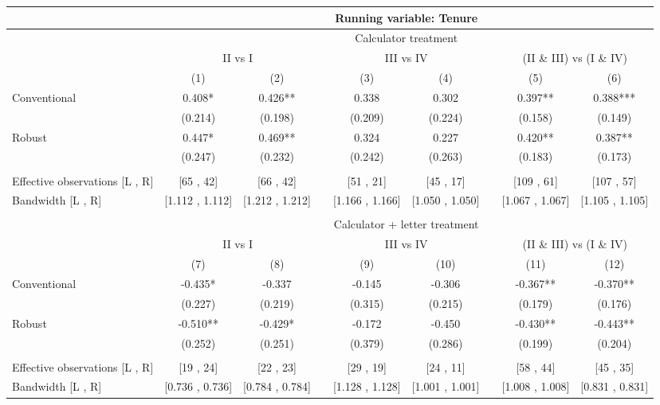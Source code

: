 \begin{tabular}{lcccccccc}
\toprule
      & \multicolumn{8}{c}{Running variable: Tenure} \\
\midrule
      & \multicolumn{8}{c}{Calculator treatment} \\
\midrule
      & \multicolumn{2}{c}{II vs I} &       & \multicolumn{2}{c}{III vs IV} &       & \multicolumn{2}{c}{(II \& III) vs (I \& IV)} \\
\cmidrule{2-3}\cmidrule{5-6}\cmidrule{8-9}      & (1)   & (2)   &       & (3)   & (4)   &       & (5)   & (6) \\
\midrule
\midrule
Conventional & 0.408* & 0.426** &       & 0.338 & 0.302 &       & 0.397** & 0.388*** \\
      & (0.214) & (0.198) &       & (0.209) & (0.224) &       & (0.158) & (0.149) \\
Robust & 0.447* & 0.469** &       & 0.324 & 0.227 &       & 0.420** & 0.387** \\
      & (0.247) & (0.232) &       & (0.242) & (0.263) &       & (0.183) & (0.173) \\
      &       &       &       &       &       &       &       &  \\
\midrule
Effective observations [L , R] & [65 ,  42] & [66 ,  42] &       & [51 ,  21] & [45 ,  17] &       & [109 ,  61] & [107 ,  57] \\
Bandwidth [L , R] & [1.112 ,  1.112] & [1.212 ,  1.212] &       & [1.166 ,  1.166] & [1.050 ,  1.050] &       & [1.067 ,  1.067] & [1.105 ,  1.105] \\
\midrule
\midrule
      &       &       &       &       &       &       &       &  \\
\midrule
      & \multicolumn{8}{c}{Calculator + letter treatment} \\
\midrule
      & \multicolumn{2}{c}{II vs I} &       & \multicolumn{2}{c}{III vs IV} &       & \multicolumn{2}{c}{(II \& III) vs (I \& IV)} \\
\cmidrule{2-3}\cmidrule{5-6}\cmidrule{8-9}      & (7)   & (8)   &       & (9)   & (10)  &       & (11)  & (12) \\
\midrule
\midrule
Conventional & -0.435* & -0.337 &       & -0.145 & -0.306 &       & -0.367** & -0.370** \\
      & (0.227) & (0.219) &       & (0.315) & (0.215) &       & (0.179) & (0.176) \\
Robust & -0.510** & -0.429* &       & -0.172 & -0.450 &       & -0.430** & -0.443** \\
      & (0.252) & (0.251) &       & (0.379) & (0.286) &       & (0.199) & (0.204) \\
      &       &       &       &       &       &       &       &  \\
\midrule
Effective observations [L , R] & [19 ,  24] & [22 ,  23] &       & [29 ,  19] & [24 ,  11] &       & [58 ,  44] & [45 ,  35] \\
Bandwidth [L , R] & [0.736 ,  0.736] & [0.784 ,  0.784] &       & [1.128 ,  1.128] & [1.001 ,  1.001] &       & [1.008 ,  1.008] & [0.831 ,  0.831] \\
\bottomrule
\bottomrule
\end{tabular}%
